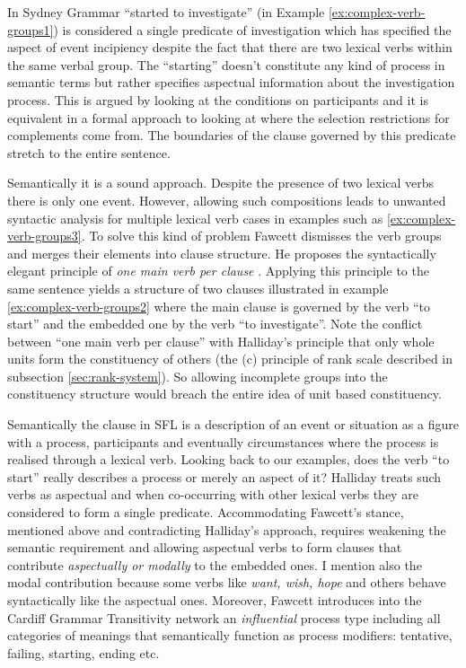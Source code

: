 In Sydney Grammar ``started to investigate'' (in Example \ref{ex:complex-verb-groups1}) is considered a single predicate of investigation which has specified the aspect of event incipiency despite the fact that there are two lexical verbs within the same verbal group. The ``starting'' doesn't constitute any kind of process in semantic terms but rather specifies aspectual information about the investigation process. 
This is argued by looking at the conditions on participants and it is equivalent in a formal approach to looking at where the selection restrictions for complements come from. The boundaries of the clause governed by this predicate stretch to the entire sentence.

Semantically it is a sound approach. Despite the presence of two lexical verbs there is only one event. However, allowing such compositions leads to unwanted syntactic analysis for multiple lexical verb cases in examples such as \ref{ex:complex-verb-groups3}. To solve this kind of problem Fawcett dismisses the verb groups and merges their elements into clause structure. He proposes the syntactically elegant principle of \textit{one main verb per clause} \citep{Fawcett2008}. Applying this principle to the same sentence yields a structure of two clauses illustrated in example \ref{ex:complex-verb-groups2} where the main clause is governed by the verb ``to start'' and the embedded one by the verb ``to investigate''. Note the conflict between ``one main verb per clause'' with Halliday's principle that only whole units form the constituency of others (the (c) principle of rank scale described in subsection \ref{sec:rank-system}). So allowing incomplete groups into the constituency structure would breach the entire idea of unit based constituency. 

Semantically the clause in SFL is a description of an event or situation as a figure with a process, participants and eventually circumstances where the process is realised through a lexical verb. Looking back to our examples, does the verb ``to start'' really describes a process or merely an aspect of it? Halliday treats such verbs as aspectual and when co-occurring with other lexical verbs they are considered to form a single predicate. Accommodating Fawcett's stance, mentioned above and contradicting Halliday's approach, requires weakening the semantic requirement and allowing aspectual verbs to form clauses that contribute \textit{aspectually or modally} to the embedded ones. I mention also the modal contribution because some verbs like \textit{want, wish, hope} and others behave syntactically like the aspectual ones. Moreover, Fawcett introduces into the Cardiff Grammar Transitivity network an \textit{influential} process type including all categories of meanings that semantically function as process modifiers: tentative, failing, starting, ending etc.

